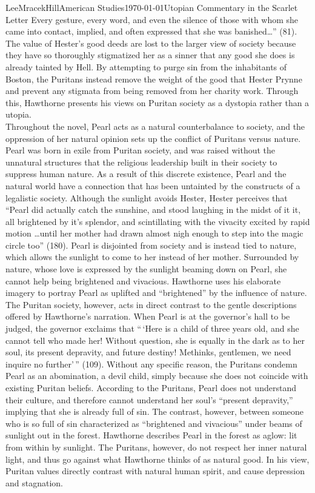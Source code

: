 \documentclass[12pt, letterpaper]{article}
\begin{document}
\begin{mla}{Lee}{Mracek}{Hill}{American Studies}{\today}{Utopian Commentary in the Scarlet Letter}
        Every gesture, every word, and even the silence of those with whom she came into contact, implied, and often expressed that she was banished\ldots'' (81). The value of Hester's good deeds are lost to the larger view of society because they have so thoroughly stigmatized her as a sinner that any good she does is already tainted by Hell. By attempting to purge sin from the inhabitants of Boston, the Puritans instead remove the weight of the good that Hester Prynne  and prevent any stigmata from being removed from her charity work. Through this, Hawthorne presents his views on Puritan society as a dystopia rather than a utopia. \\
        Throughout the novel, Pearl acts as a natural counterbalance to society, and the oppression of her natural opinion sets up the conflict of Puritans versus nature. Pearl was born in exile from Puritan society, and was raised without the unnatural structures that the religious leadership built in their society to suppress human nature. As a result of this discrete existence, Pearl and the natural world have a connection that has been untainted by the constructs of a legalistic society. Although the sunlight avoids Hester, Hester perceives that ``Pearl did actually catch the sunshine, and stood laughing in the midst of it it, all brightened by it's splendor, and scintillating with the vivacity excited by rapid motion \ldots until her mother had drawn almost nigh enough to step into the magic circle too'' (180). Pearl is disjointed from society and is instead tied to nature, which allows the sunlight to come to her instead of her mother. Surrounded by nature, whose love is expressed by the sunlight beaming down on Pearl, she cannot help being brightened and vivacious. Hawthorne uses his elaborate imagery to portray Pearl as uplifted and ``brightened'' by the influence of nature. The Puritan society, however, acts in direct contrast to the gentle descriptions offered by Hawthorne's narration. When Pearl is at the governor's hall to be judged, the governor exclaims that ``\,`Here is a child of three years old, and she cannot tell who made her! Without question, she is equally in the dark as to her soul, its present depravity, and future destiny! Methinks, gentlemen, we need inquire no further'\,'' (109). Without any specific reason, the Puritans condemn Pearl as an abomination, a devil child, simply because she does not coincide with existing Puritan beliefs. According to the Puritans, Pearl does not understand their culture, and therefore cannot understand her soul's ``present depravity,'' implying that she is already full of sin. The contrast, however, between someone who is so full of sin characterized as ``brightened and vivacious'' under beams of sunlight out in the forest. Hawthorne describes Pearl in the forest as aglow: lit from within by sunlight. The Puritans, however, do not respect her inner natural light, and thus go against what Hawthorne thinks of as natural good. In his view, Puritan values directly contrast with natural human spirit, and cause depression and stagnation.\\

\end{mla}
\end{document}
